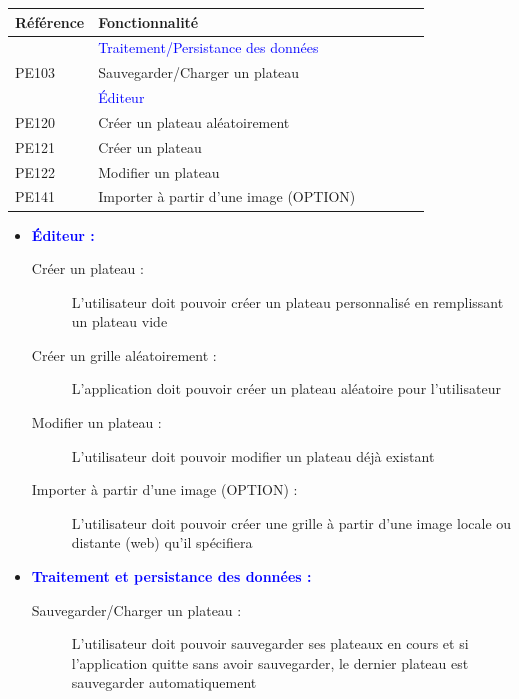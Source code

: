 \documentclass[a4paper, 12pt, twoside]{article}
\begin{document}
\begin{center}

  \begin{tabular}{|>{\centering\arraybackslash}m{0.2\linewidth}|>{\centering\arraybackslash}m{0.7\linewidth}|@{}m{0cm}@{}}
  \hline
  \textbf{Référence} & \textbf{Fonctionnalité} \\
  \hline
  & \textcolor{blue}{Traitement/Persistance des donn\'ees} &\\[5ex]
  \hline
  PE103 & Sauvegarder/Charger un plateau \\
  \hline
  & \textcolor{blue}{\'Editeur} &\\[5ex]
  \hline
  PE120 & Créer un plateau aléatoirement \\
  \hline
  PE121 & Créer un plateau \\
  \hline
  PE122 & Modifier un plateau \\
  \hline
  PE141 & Importer à partir d'une image (OPTION) \\
  \hline
  \end{tabular}
 
\end{center}

\begin{itemize}
 \item[\textbullet] \textbf{\textcolor{blue}{\'Editeur : \newline}}
 \begin{description}
    \item[Créer un plateau :] L'utilisateur doit pouvoir créer un plateau personnalisé en remplissant un plateau vide
    \item[Créer un grille aléatoirement :] L'application doit pouvoir créer un plateau aléatoire pour l'utilisateur
    \item[Modifier un plateau :] L'utilisateur doit pouvoir modifier un plateau déjà existant
    \item[Importer à partir d'une image (OPTION) :] L'utilisateur doit pouvoir créer une grille à partir d'une image locale ou distante (web) qu'il spécifiera\newline
  \end{description}
  
  \item[\textbullet] \textbf{\textcolor{blue}{Traitement et persistance des données : \newline}}
 \begin{description}
    \item[Sauvegarder/Charger un plateau :] L'utilisateur doit pouvoir sauvegarder ses plateaux en cours et si l'application quitte sans avoir sauvegarder, le dernier plateau est sauvegarder automatiquement
  \end{description}
\end{itemize}
\end{document}
